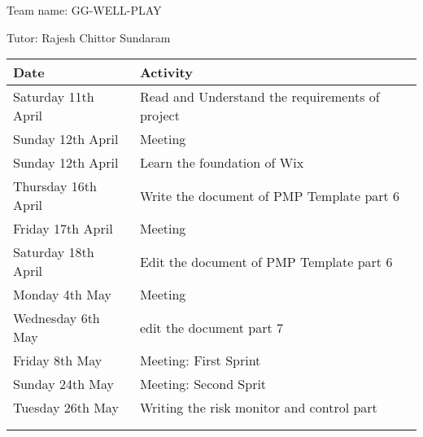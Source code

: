 Team name: GG-WELL-PLAY

Tutor: Rajesh Chittor Sundaram

\begin{tabularx}{0.95\linewidth}{%
	l%
	>{\raggedright\arraybackslash}X}%
	\toprule
	Date & Activity\\
	\midrule
	Saturday 11th April & Read and Understand the requirements of project\\
	\midrule
	Sunday 12th April & Meeting\\
	\midrule
	Sunday 12th April & Learn the foundation of Wix\\
	\midrule
	Thursday 16th April & Write the document of PMP Template part 6\\
	\midrule
	Friday 17th April & Meeting\\
	\midrule
	Saturday 18th April & Edit the document of PMP Template part 6\\
	\midrule
	Monday 4th May & Meeting\\
	\midrule
	Wednesday 6th May & edit the document part 7 \\
	\midrule
	Friday 8th May & Meeting: First Sprint\\
	\midrule
	Sunday 24th May & Meeting: Second Sprit\\
	\midrule
	Tuesday 26th May & Writing the risk monitor and control part\\
	\bottomrule
	\\
	\caption{Timesheet -- Yicun}  
	\label{tab:timesheetYicun}
\end{tabularx}